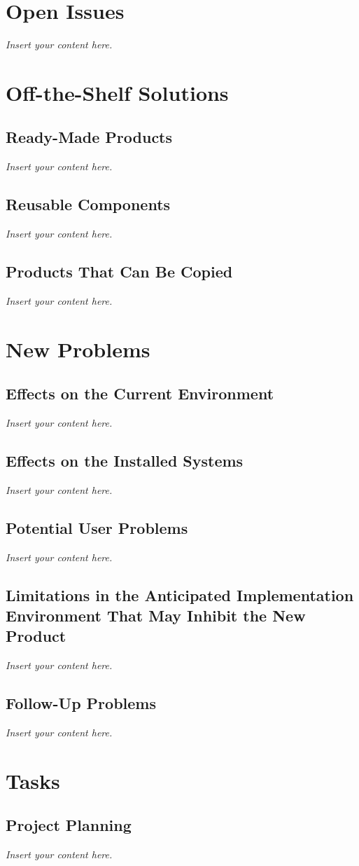 \documentclass[12pt]{article}
\newcommand{\lips}{\textit{Insert your content here.}}
\begin{document}
\section{Open Issues}
\lips

\section{Off-the-Shelf Solutions}
\subsection{Ready-Made Products}
\lips
\subsection{Reusable Components}
\lips
\subsection{Products That Can Be Copied}
\lips

\section{New Problems}
\subsection{Effects on the Current Environment}
\lips
\subsection{Effects on the Installed Systems}
\lips
\subsection{Potential User Problems}
\lips
\subsection{Limitations in the Anticipated Implementation Environment That May
Inhibit the New Product}
\lips
\subsection{Follow-Up Problems}
\lips

\section{Tasks}
\subsection{Project Planning}
\lips
\end{document}
